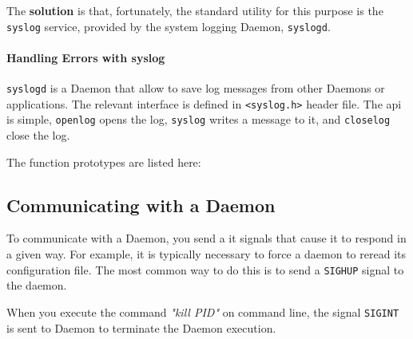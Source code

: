 The \textbf{solution} is that, fortunately, the standard utility for this purpose is the \texttt{syslog} service, provided by the system logging Daemon, \texttt{syslogd}.

\paragraph{\textbf{Handling Errors with syslog}}

\texttt{syslogd} is a Daemon that allow to save log messages from other Daemons or applications.
The relevant interface is defined in \texttt{<syslog.h>} header file.
The \gls{api} is simple, \texttt{openlog} opens the log, \texttt{syslog} writes a message to it, and
\texttt{closelog} close the log.

The function prototypes are listed here:
%

%

\subsection{Communicating with a Daemon}

To communicate with a Daemon, you send a it signals that cause it to respond in a given way.
For example, it is typically necessary to force a daemon to reread its configuration file.
The most common way to do this is to send a \texttt{SIGHUP} signal to the daemon.

When you execute the command \textit{"kill PID"} on command line, the signal \texttt{SIGINT} is sent to Daemon to terminate the Daemon execution.

